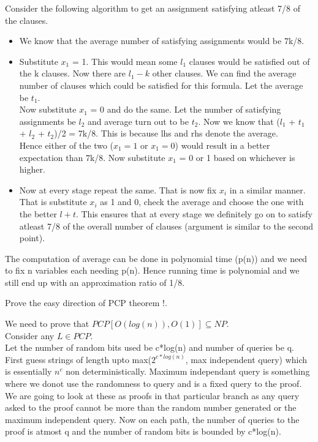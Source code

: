 \documentclass[12pt]{exam}
\begin{document}
\begin{questions}
\begin{solution}
Consider the following algorithm to get an assignment satisfying atleast
7/8 of the clauses.
\begin{itemize}
\item We know that the average number of satisfying assignments
would be 7k/8.
\item Substitute $x_1$ = 1. This would mean some $l_1$ clauses would
be satisfied out of the k clauses. Now there are $l_1-k$ other clauses.
We can find the average number of clauses which could be satisfied
for this formula. Let the average be $t_1$.\\
Now substitute $x_1$ = 0 and do the same. Let the number of
satisfying assignments be $l_2$ and average turn out to be $t_2$.
Now we know that ($l_1$ + $t_1$ + $l_2$ + $t_2$)/2 = 7k/8.
This is because lhs and rhs denote the average.\\
Hence either of the two ($x_1 = 1$ or $x_1 = 0$) would result in
a better expectation than 7k/8. Now substitute $x_1$ = 0 or 1
based on whichever is higher.
\item Now at every stage repeat the same. That is now fix
$x_i$ in a similar manner. That is substitute $x_i$ as 1 and 0,
check the average and choose the one with the better $l+t$.
This ensures that at every stage we definitely go on
to satisfy atleast 7/8 of the overall number of clauses
(argument is similar to the second point).
\end{itemize}
The computation of average can be done in polynomial time (p(n)) and we need
to fix n variables each needing p(n). Hence running time is polynomial
and we still end up with an approximation ratio of 1/8.
\end{solution}
\question[10]
Prove the easy direction of PCP theorem !.
\begin{solution}
We need to prove that $PCP[O(log(n)), O(1)] \subseteq NP$.\\

Consider any $L \in PCP$.\\
Let the number of random bits used be c*log(n) and number of queries be q.\\
First guess strings of length upto max($2^{c*log(n)}$, max independent query) which is essentially $n^c$ non deterministically. Maximum independant query is something where
we donot use the randomness to query and is a fixed query to the proof.
We are going to look at these as proofs in that particular branch as any query
asked to the proof cannot be more than the random number generated or the maximum
independent query. Now on each path, the number of queries to the proof is
atmost q and the number of random bits is bounded by c*log(n).\\


\end{solution}
\end{questions}
\end{document}
